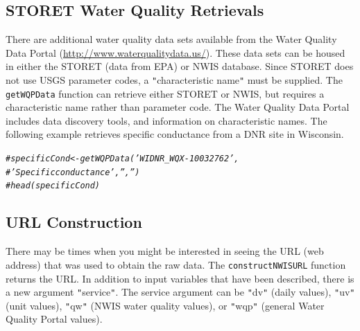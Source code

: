 \documentclass[a4paper,11pt]{article}\usepackage[]{graphicx}\usepackage[]{color}
\makeatletter
\newcommand{\hlcom}[1]{\textcolor[rgb]{0.678,0.584,0.686}{\textit{#1}}}%
\newenvironment{kframe}{%
 \def\at@end@of@kframe{}%
 \ifinner\ifhmode%
  \def\at@end@of@kframe{\end{minipage}}%
  \begin{minipage}{\columnwidth}%
 \fi\fi%
 \def\FrameCommand##1{\hskip\@totalleftmargin \hskip-\fboxsep
 \colorbox{shadecolor}{##1}\hskip-\fboxsep
     \hskip-\linewidth \hskip-\@totalleftmargin \hskip\columnwidth}%
 \MakeFramed {\advance\hsize-\width
   \@totalleftmargin\z@ \linewidth\hsize
   \@setminipage}}%
 {\par\unskip\endMakeFramed%
 \at@end@of@kframe}
\newenvironment{knitrout}{}{} %
\makeatother
\begin{document}
\subsection{STORET Water Quality Retrievals}
\label{sec:usgsSTORET}
There are additional water quality data sets available from the Water Quality Data Portal (\url{http://www.waterqualitydata.us/}).  These data sets can be housed in either the STORET (data from EPA) or NWIS database.  Since STORET does not use USGS parameter codes, a \texttt{"}characteristic name\texttt{"} must be supplied.  The \texttt{getWQPData} function can retrieve either STORET or NWIS, but requires a characteristic name rather than parameter code. The Water Quality Data Portal includes data discovery tools, and information on characteristic names. The following example retrieves specific conductance from a DNR site in Wisconsin. 


\begin{knitrout}
\color{fgcolor}\begin{kframe}
\begin{alltt}
\hlcom{# specificCond <- getWQPData('WIDNR_WQX-10032762',}
\hlcom{#                 'Specific conductance','','')}
\hlcom{# head(specificCond)}
\end{alltt}
\end{kframe}
\end{knitrout}

\FloatBarrier
\subsection{URL Construction}
\label{sec:usgsURL}
There may be times when you might be interested in seeing the URL (web address) that was used to obtain the raw data. The \texttt{constructNWISURL} function returns the URL.  In addition to input variables that have been described, there is a new argument \texttt{"}service\texttt{"}. The service argument can be \texttt{"}dv\texttt{"} (daily values), \texttt{"}uv\texttt{"} (unit values), \texttt{"}qw\texttt{"} (NWIS water quality values), or \texttt{"}wqp\texttt{"} (general Water Quality Portal values).
 
\end{document}
